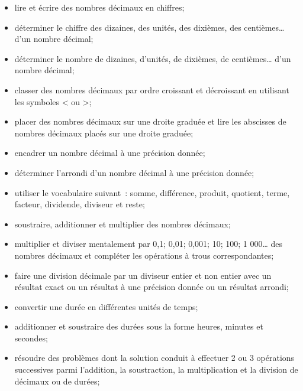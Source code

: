 \begin{acquis}
\begin{itemize}
\item lire et écrire des nombres décimaux en chiffres;
\item déterminer le chiffre des dizaines, des unités, des dixièmes, des centièmes… d'un nombre décimal;
\item déterminer le nombre de dizaines, d’unités, de dixièmes, de centièmes… d'un nombre décimal;
\item classer des nombres décimaux par ordre croissant et décroissant en utilisant les symboles < ou >;
\item placer des nombres décimaux sur une droite graduée et lire les abscisses de nombres décimaux placés sur une droite graduée;
\item encadrer un nombre décimal à une précision donnée;
\item déterminer l'arrondi d'un nombre décimal à une précision donnée;
\item utiliser le vocabulaire suivant : somme, différence, produit, quotient, terme, facteur, dividende, diviseur et reste;
\item soustraire, additionner et multiplier des nombres décimaux;
\item multiplier et diviser mentalement par 0,1; 0,01; 0,001; 10; 100; 1 000… des nombres décimaux et compléter les opérations à trous correspondantes;
\item faire une division décimale par un diviseur entier et non entier avec un résultat exact ou un résultat à une précision donnée ou un résultat arrondi;
\item convertir une durée en différentes unités de temps;
\item additionner et soustraire des durées sous la forme heures, minutes et secondes;
\item résoudre des problèmes dont la solution conduit à effectuer 2 ou 3 opérations successives parmi l’addition, la soustraction, la multiplication et la division de décimaux ou de durées;
\end{itemize}
\end{acquis}



